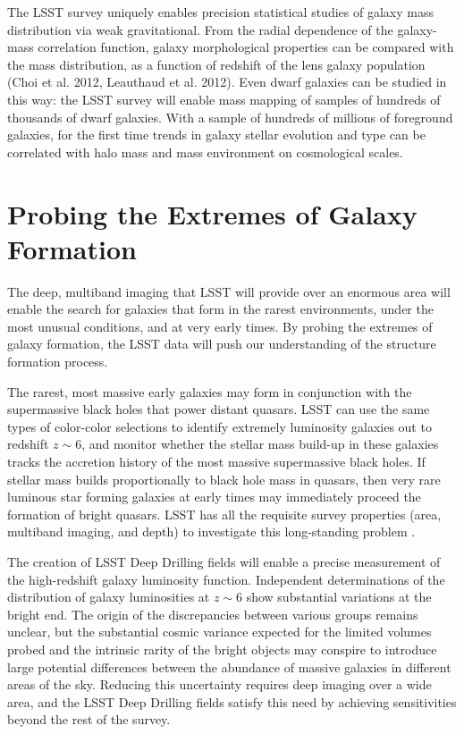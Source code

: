 {The LSST survey uniquely enables precision statistical studies of 
galaxy mass
distribution via weak gravitational.
From the radial dependence of
the galaxy-mass correlation function, galaxy morphological properties 
can be compared with the mass distribution, as a function
of redshift of the lens galaxy population (Choi et al. 2012,
Leauthaud et al. 2012).  Even dwarf galaxies 
can be studied in this way: the LSST survey will enable mass
mapping of samples of hundreds of thousands of dwarf galaxies.
With a sample of hundreds of millions of foreground galaxies, 
for the first time trends in galaxy stellar evolution and type 
can be correlated with halo mass and mass environment on cosmological scales.

\section{Probing the Extremes of Galaxy Formation}
\label{sec:sci:gal:bkgnd:rare}

The deep, multiband imaging that LSST will provide over an enormous
area will enable the search for galaxies that form in the
rarest environments, under the most unusual conditions,
and at very early times. By probing the extremes of
galaxy formation, the LSST data will push our 
understanding of the structure formation process.

The rarest, most massive early galaxies may form in 
conjunction with the supermassive black holes that
power distant quasars. LSST can use the same
types of color-color selections to identify extremely
luminosity galaxies out to redshift $z\sim6$, and
monitor whether the stellar mass build-up in these
galaxies tracks the accretion history of the most
massive supermassive black holes. If stellar mass
builds proportionally to black hole mass in quasars,
then very rare luminous star forming galaxies at
early times may immediately proceed the formation
of bright quasars. LSST has all the requisite
survey properties (area, multiband imaging, and
depth) to investigate this long-standing problem \citep{robertson2007a}.

The creation of LSST Deep Drilling fields will
enable a precise measurement of the
high-redshift galaxy luminosity function.
Independent determinations of the distribution of 
galaxy luminosities at $z\sim6$ show substantial
variations at the bright end. The origin of
the discrepancies between various groups remains
unclear, but the substantial cosmic variance expected
for the limited volumes probed and the intrinsic
rarity of the bright objects may conspire to
introduce large potential differences between
the abundance of massive galaxies in different
areas of the sky. Reducing this uncertainty requires
deep imaging over a wide area, and the LSST Deep Drilling
fields satisfy this need by achieving sensitivities
beyond the rest of the survey. 

}
